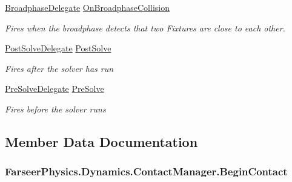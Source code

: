 \begin{DoxyCompactItemize}
\hyperlink{namespace_farseer_physics_1_1_dynamics_a18794aefafdc6a2a661ec21fc83951b9}{Broadphase\+Delegate} \hyperlink{class_farseer_physics_1_1_dynamics_1_1_contact_manager_a876a3232bd9635b30bc83da6a13b8e25}{On\+Broadphase\+Collision}
\begin{DoxyCompactList}\small\item\em Fires when the broadphase detects that two Fixtures are close to each other. \end{DoxyCompactList}\item 
\hyperlink{namespace_farseer_physics_1_1_dynamics_ab059675aeb57a622f51aeb9cb2d05a14}{Post\+Solve\+Delegate} \hyperlink{class_farseer_physics_1_1_dynamics_1_1_contact_manager_aea3a90b99f90864ebdaa6ebf6cda2b92}{Post\+Solve}
\begin{DoxyCompactList}\small\item\em Fires after the solver has run \end{DoxyCompactList}\item 
\hyperlink{namespace_farseer_physics_1_1_dynamics_aae28b8226bebdf50920ba4950f4dc0ca}{Pre\+Solve\+Delegate} \hyperlink{class_farseer_physics_1_1_dynamics_1_1_contact_manager_a0ffed8f9877edd9db791dcc923f16cb1}{Pre\+Solve}
\begin{DoxyCompactList}\small\item\em Fires before the solver runs \end{DoxyCompactList}\end{DoxyCompactItemize}


\subsection{Member Data Documentation}
\hypertarget{class_farseer_physics_1_1_dynamics_1_1_contact_manager_abd5fb7b5dff0a2e01b0be2877de80350}{
\subsubsection[{Begin\+Contact}]{ Farseer\+Physics.\+Dynamics.\+Contact\+Manager.\+Begin\+Contact}}\label{class_farseer_physics_1_1_dynamics_1_1_contact_manager_abd5fb7b5dff0a2e01b0be2877de80350}


